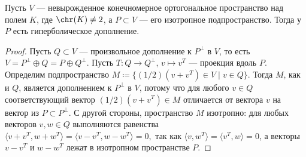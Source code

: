 \documentclass[
	extrafontsizes,
	11pt,
	hyphens,
]{memoir}
\begin{document}


\begin{theorem}
\label{thm:hyp_cpl_exists}
Пусть \(V\) --- невырожденное конечномерное ортогональное пространство над полем \(K\), где \(\chr(K) \neq 2\), а \(P \subset V\) --- его изотропное подпространство.
Тогда у \(P\) есть гиперболическое дополнение.
\end{theorem}


\begin{proof}
%
Пусть \(Q \subset V\) --- произвольное дополнение к \(P^\perp\) в \(V\),
то есть \(V = P^\perp \oplus Q = P \oplus Q^\perp\).
Пусть \(T : Q \to Q^\perp\), \(v \mapsto v^T\) --- проекция вдоль \(P\).
Определим подпространство \(M \coloneqq \{(1/2)(v + v^T) \in V \mid v \in Q\}\).
Тогда \(M\), как и \(Q\), является дополнением к \(P^\perp\) в \(V\), потому что для любого \(v \in Q\) соответствующий вектор \((1/2)(v + v^T) \in M\) отличается от вектора \(v\) на вектор из \(P \subset P^\perp\).
С другой стороны, пространство \(M\) изотропно: для любых векторов \(v,w \in Q\) выполняются равенства
\(
\langle v + v^T, w + w^T \rangle =
\langle v - v^T, w - w^T \rangle = 0,
\)
так как \(\langle v, w^T \rangle = \langle v^T, w \rangle = 0\), а векторы \(v - v^T\) и \(w - w^T\) лежат в изотропном пространстве \(P\).
\end{proof}
\end{document}
